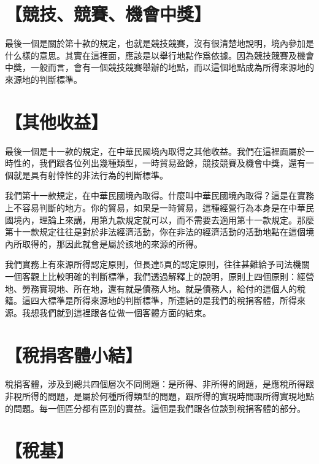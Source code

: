 \documentclass[]{ctexbook}
\begin{document}
\hypertarget{ux7af6ux6280ux7af6ux8cfdux6a5fux6703ux4e2dux734e}{%
\section{【競技、競賽、機會中獎】}\label{ux7af6ux6280ux7af6ux8cfdux6a5fux6703ux4e2dux734e}}

最後一個是關於第十款的規定，也就是競技競賽，沒有很清楚地說明，境內參加是什么樣的意思。其實在這裡面，應該是以舉行地點作爲依據。因為競技競賽及機會中獎，一般而言，會有一個競技競賽舉辦的地點，而以這個地點成為所得來源地的來源地的判斷標準。

\hypertarget{ux5176ux4ed6ux6536ux76ca}{%
\section{【其他收益】}\label{ux5176ux4ed6ux6536ux76ca}}

最後一個是十一款的規定，在中華民國境內取得之其他收益。我們在這裡面屬於一時性的，我們跟各位列出幾種類型，一時貿易盈餘，競技競賽及機會中獎，還有一個就是具有射悻性的非法行為的判斷標準。

我們第十一款規定，在中華民國境內取得。什麼叫中華民國境內取得？這是在實務上不容易判斷的地方。你的貿易，如果是一時貿易，這種經營行為本身是在中華民國境內，理論上來講，用第九款規定就可以，而不需要去適用第十一款規定。那麼第十一款規定往往是對於非法經濟活動，你在非法的經濟活動的活動地點在這個境內所取得的，那因此就會是屬於該地的來源的所得。

我們實務上有來源所得認定原則，但長達5頁的認定原則，往往甚難給予司法機關一個客觀上比較明確的判斷標準，我們透過解釋上的說明，原則上四個原則：經營地、勞務實現地、所在地，還有就是債務人地。就是債務人，給付的這個人的稅籍。這四大標準是所得來源地的判斷標準，所連結的是我們的稅捐客體，所得來源。我想我們就到這裡跟各位做一個客體方面的結束。

\hypertarget{ux7a05ux6350ux5ba2ux9ad4ux5c0fux7d50}{%
\section{【稅捐客體小結】}\label{ux7a05ux6350ux5ba2ux9ad4ux5c0fux7d50}}

稅捐客體，涉及到總共四個層次不同問題：是所得、非所得的問題，是應稅所得跟非稅所得的問題，是屬於何種所得類型的問題，跟所得的實現時間跟所得實現地點的問題。每一個區分都有區別的實益。這個是我們跟各位談到稅捐客體的部分。

\hypertarget{ux7a05ux57fa-1}{%
\section{【稅基】}\label{ux7a05ux57fa-1}}
\end{document}
